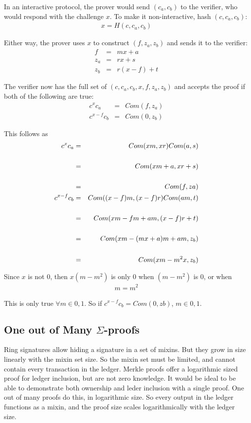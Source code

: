 \documentclass{article}
\begin{document}
In an interactive protocol, the prover would send $(c_a,c_b)$ to the verifier, who would respond with the challenge $x$.  To make it non-interactive, hash $(c, c_a, c_b)$:
\begin{eqnarray}
  x = H(c, c_a, c_b)
\end{eqnarray}

Either way, the prover uses $x$ to construct $(f, z_a, z_b)$ and sends it to the verifier:
\begin{eqnarray}
  f &=& mx + a\\
  z_a &=& rx + s\\
  z_b &=& r(x-f) + t
\end{eqnarray}

The verifier now has the full set of $(c, c_a, c_b, x, f, z_a, z_b)$ and accepts the proof if both of the following are true:
\begin{eqnarray}
  c^x c_a &=& Com(f, z_a)\\
  c^{x-f} c_b &=& Com(0, z_b)
\end{eqnarray}

This follows as 
\begin{eqnarray}
  c^x c_a &=& Com(xm,xr) Com(a,s)\\
  \cr &=& Com(xm+a, xr+s)\\
  \cr &=& Com(f, za)\\
  c^{x-f} c_b &=& Com((x-f)m, (x-f)r) Com(am, t)\\
  \cr &=& Com(xm - fm + am, (x-f)r + t)\\
  \cr &=& Com(xm - (mx + a)m + am, z_b)\\
  \cr &=& Com(xm - m^2 x, z_b)
\end{eqnarray}

Since $x$ is not $0$, then $x (m-m^2)$ is only $0$ when $(m-m^2)$ is $0$, or when
\begin{eqnarray}
  m = m^2
\end{eqnarray}

This is only true $\forall m \in {0,1}$.  So if $c^{x-f} c_b = Com(0,zb)$, $m \in {0,1}$.


\subsection{One out of Many $\Sigma$-proofs}

Ring signatures allow hiding a signature in a set of mixins.  But they grow in size linearly with the mixin set size.  So the mixin set must be limited, and cannot contain every transaction in the ledger.  Merkle proofs offer a logarithmic sized proof for ledger inclusion, but are not zero knowledge.  It would be ideal to be able to demonstrate both ownership and leder inclusion with a single proof.  One out of many proofs do this, in logarithmic size.  So every output in the ledger functions as a mixin, and the proof size scales logarithmically with the ledger size.
\end{document}
